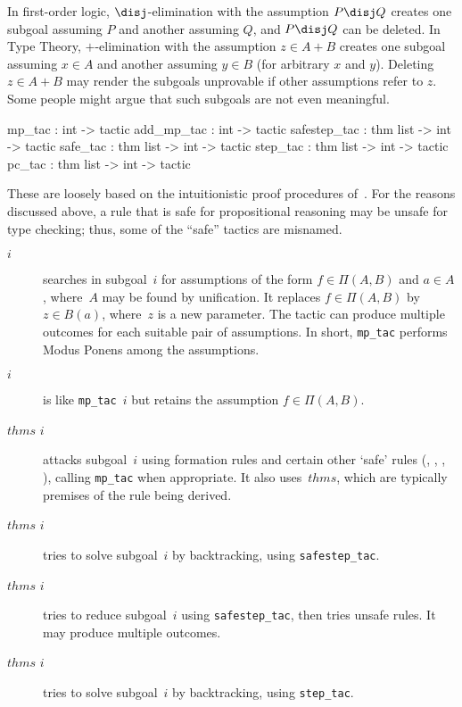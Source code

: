 In first-order logic, $\disj$-elimination with the assumption $P\disj Q$
creates one subgoal assuming $P$ and another assuming $Q$, and $P\disj Q$
can be deleted.  In Type Theory, $+$-elimination with the assumption $z\in
A+B$ creates one subgoal assuming $x\in A$ and another assuming $y\in B$
(for arbitrary $x$ and $y$).  Deleting $z\in A+B$ may render the subgoals
unprovable if other assumptions refer to $z$.  Some people might argue that
such subgoals are not even meaningful.
\begin{ttbox}
mp_tac       : int -> tactic
add_mp_tac   : int -> tactic
safestep_tac : thm list -> int -> tactic
safe_tac     : thm list -> int -> tactic
step_tac     : thm list -> int -> tactic
pc_tac       : thm list -> int -> tactic
\end{ttbox}
These are loosely based on the intuitionistic proof procedures
of~.  For the reasons discussed above, a rule that is safe for
propositional reasoning may be unsafe for type checking; thus, some of the
``safe'' tactics are misnamed.
\begin{description}
\item[ $i$] 
searches in subgoal~$i$ for assumptions of the form $f\in\Pi(A,B)$ and
$a\in A$, where~$A$ may be found by unification.  It replaces
$f\in\Pi(A,B)$ by $z\in B(a)$, where~$z$ is a new parameter.  The tactic
can produce multiple outcomes for each suitable pair of assumptions.  In
short, {\tt mp_tac} performs Modus Ponens among the assumptions.

\item[ $i$]
is like {\tt mp_tac}~$i$ but retains the assumption $f\in\Pi(A,B)$.

\item[ $thms$ $i$]
attacks subgoal~$i$ using formation rules and certain other `safe' rules
(, , , ), calling
{\tt mp_tac} when appropriate.  It also uses~$thms$,
which are typically premises of the rule being derived.

\item[ $thms$ $i$]
tries to solve subgoal~$i$ by backtracking, using {\tt safestep_tac}.

\item[ $thms$ $i$]
tries to reduce subgoal~$i$ using {\tt safestep_tac}, then tries unsafe
rules.  It may produce multiple outcomes.

\item[ $thms$ $i$]
tries to solve subgoal~$i$ by backtracking, using {\tt step_tac}.
\end{description}



